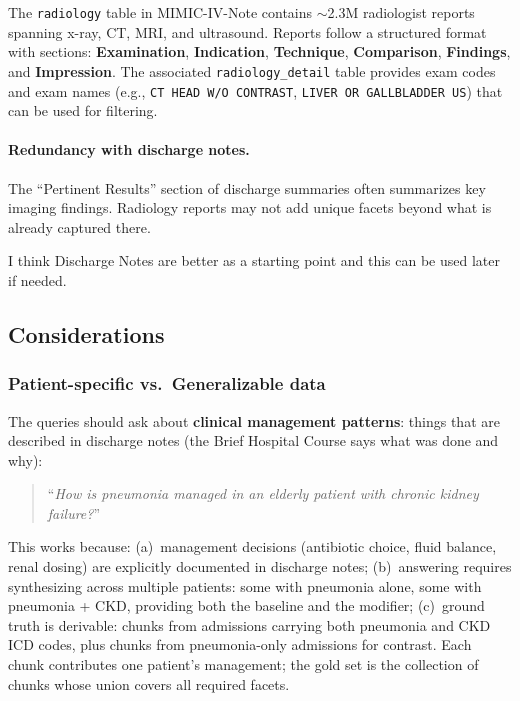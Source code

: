 \documentclass[11pt,a4paper]{article}
\newcommand{\field}[1]{\nolinkurl{#1}}
\begin{document}
The \field{radiology} table in MIMIC-IV-Note contains $\sim$2.3M radiologist reports spanning x-ray, CT, MRI, and ultrasound.  Reports follow a structured format with sections: \textbf{Examination}, \textbf{Indication}, \textbf{Technique}, \textbf{Comparison}, \textbf{Findings}, and \textbf{Impression}.  The associated \field{radiology\_detail} table provides exam codes and exam names (e.g., \texttt{CT HEAD W/O CONTRAST}, \texttt{LIVER OR GALLBLADDER US}) that can be used for filtering.

\paragraph{Redundancy with discharge notes.}  The ``Pertinent Results'' section of discharge summaries often summarizes key imaging findings.
Radiology reports may not add unique facets beyond what is already captured there.

I think Discharge Notes are better as a starting point and this can be used later if needed.
\bigskip

\subsection{Considerations}

\subsubsection{Patient-specific vs.\ Generalizable data}
\label{sec:tension}

The queries should ask about \textbf{clinical management patterns}: things that are described in discharge notes (the Brief Hospital Course says what was done and why):
\begin{quote}
	\small
	``\emph{How is pneumonia managed in an elderly patient with chronic kidney failure?}''
\end{quote}

This works because: (a)~management decisions (antibiotic choice, fluid balance, renal dosing) are explicitly documented in discharge notes; (b)~answering requires synthesizing across multiple patients: some with pneumonia alone, some with pneumonia + CKD, providing both the baseline and the modifier; (c)~ground truth is derivable: chunks from admissions carrying both pneumonia and CKD ICD codes, plus chunks from pneumonia-only admissions for contrast.  Each chunk contributes one patient's management; the gold set is the collection of chunks whose union covers all required facets.
\end{document}
